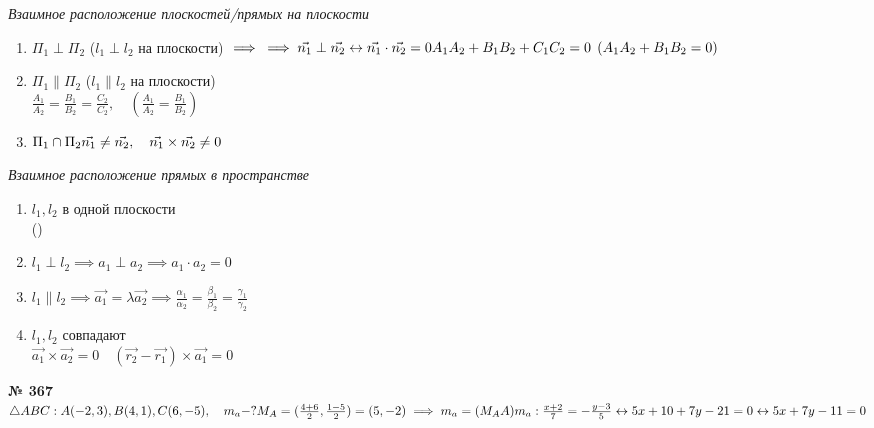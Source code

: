 \documentclass[12pt]{article}
\newenvironment{task}[1][0]{\vspace{.5cm} {\textbf{№ #1} \vspace{.5cm}\\ }}{}
\begin{document}
\emph{Взаимное расположение плоскостей/прямых на плоскости}
\begin{enumerate}
	\item { $\Pi_1 \perp \Pi_2$ ($l_1 \perp l_2$ на плоскости) $\implies\\
\implies \vec{n_1} \perp \vec{n_2} \leftrightarrow \vec{n_1} \cdot \vec{n_2} = 0\\
A_1 A_2 + B_1 B_2 +C_1 C_2 = 0 \:\: (A_1 A_2 + B_1 B_2 = 0)$
}
\item{$\Pi_1 \parallel \Pi_2$ ($l_1 \parallel l_2$ на плоскости) \\
	$\frac{A_1}{A_2} = \frac{B_1}{B_2} = \frac{C_2}{C_2}, \quad (\frac{A_1}{A_2} = \frac{B_1}{B_2})$
}
\item{$\Pi_1 \cap \Pi_2\\
\vec{n_1} \neq \vec{n_2}, \quad \vec{n_1} \times \vec{n_2} \neq 0
$
}
\end{enumerate}
\emph{Взаимное расположение прямых в пространстве}
\begin{enumerate}
	\item{ $l_1, l_2$ в одной плоскости\\
()
		
}
	\item {$l_1 \perp l_2 \implies a_1 \perp a_2 \implies a_1 \cdot a_2 = 0$
}
	\item{$l_1 \parallel l_2 \implies \vec{a_1} = \lambda \vec{a_2} \implies \frac{\alpha_1}{\alpha_2}=\frac{\beta_1}{\beta_2}=\frac{\gamma_1}{\gamma_2}$
}
\item{$l_1, l_2$ совпадают\\
	$\vec{a_1} \times \vec{a_2}=0 \quad (\vec{r_2} - \vec{r_1}) \times \vec{a_1}=0$
}
\end{enumerate}

\begin{task}[367]
$\triangle ABC: A(-2, 3), B(4, 1), C(6, -5), \quad m_a-?\\
M_A=(\frac{4+6}{2}, \frac{1-5}{2})=(5, -2) \implies m_a = (M_A A)\\
m_a: \frac{x+2}{7}=-\frac{y-3}{5} \leftrightarrow 5x+10+7y-21=0 \leftrightarrow 5x+7y-11=0\\
$
\end{task}
\end{document}
